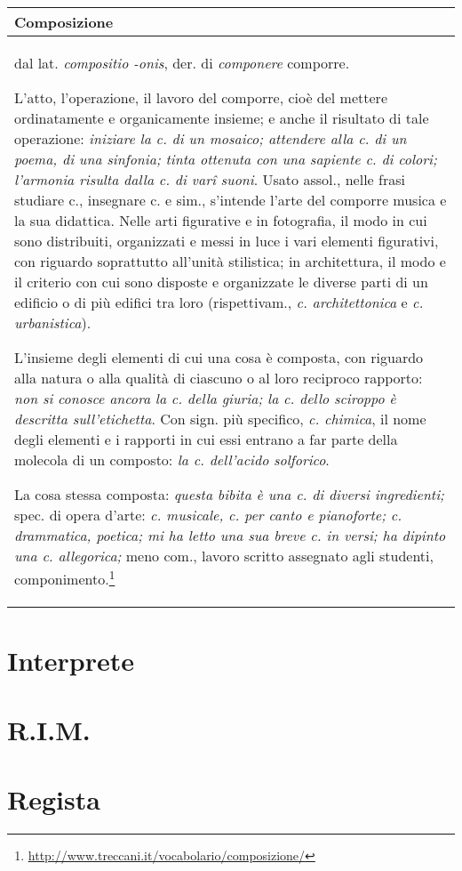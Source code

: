 		\begin{tabular}{L{.969\textwidth}}%
		\toprule
			\textbf{Composizione}\\
		\midrule
			dal lat. \emph{compositio -onis}, der. di \emph{componere} comporre.

			\begin{compactitem}
        \item L’atto, l’operazione, il lavoro del comporre, cioè del mettere
          ordinatamente e organicamente insieme; e anche il risultato di tale
          operazione: \emph{iniziare la c. di un mosaico; attendere alla c. di
          un poema, di una sinfonia; tinta ottenuta con una sapiente c. di colori;
          l’armonia risulta dalla c. di varî suoni}. Usato assol., nelle frasi
          studiare c., insegnare c. e sim., s’intende l’arte del comporre musica
          e la sua didattica. Nelle arti figurative e in fotografia, il modo in
          cui sono distribuiti, organizzati e messi in luce i vari elementi
          figurativi, con riguardo soprattutto all’unità stilistica; in
          architettura, il modo e il criterio con cui sono disposte e organizzate
          le diverse parti di un edificio o di più edifici tra loro
          (rispettivam., \emph{c. architettonica} e \emph{c. urbanistica}).
        \item L’insieme degli elementi di cui una cosa è composta, con riguardo
          alla natura o alla qualità di ciascuno o al loro reciproco rapporto:
          \emph{non si conosce ancora la c. della giuria; la c. dello sciroppo è
          descritta sull’etichetta}. Con sign. più specifico, \emph{c. chimica},
          il nome degli elementi e i rapporti in cui essi entrano a far parte
          della molecola di un composto: \emph{la c. dell’acido solforico}.
        \item La cosa stessa composta: \emph{questa bibita è una c. di diversi ingredienti;}
          spec. di opera d’arte: \emph{c. musicale, c. per canto e pianoforte;
          c. drammatica, poetica; mi ha letto una sua breve c. in versi;
          ha dipinto una c. allegorica;} meno com., lavoro scritto assegnato
          agli studenti, componimento.\footnote{\url{http://www.treccani.it/vocabolario/composizione/}}
      \end{compactitem} \\
    \bottomrule
		\end{tabular}

\section{Interprete}
\section{R.I.M.}
\section{Regista}
